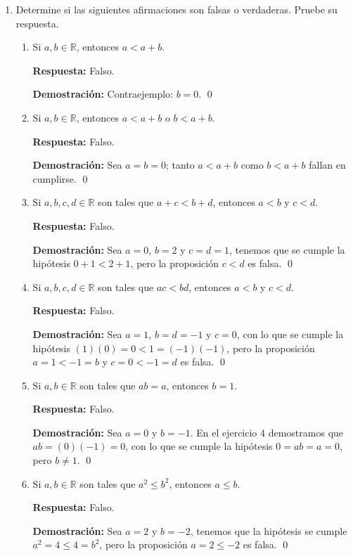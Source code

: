 \documentclass[11pt]{article}
\newcommand{\R}{\mathbb{R}}
\begin{document}
\begin{enumerate}
\item Determine si las siguientes afirmaciones son falsas o verdaderas. Pruebe su respuesta.
  \begin{enumerate}[label=(\alph*)]
    \item Si $a,b\in \R$, entonces $a<a+b$.

    \textbf{Respuesta:} Falso.

    \textbf{Demostración:} Contraejemplo: $b=0$. \qed

    \item Si $a,b\in \R$, entonces $a<a+b$ o $b<a+b$.

    \textbf{Respuesta:} Falso.

    \textbf{Demostración:}  Sea $a=b=0$; tanto $a<a+b$ como $b<a+b$ fallan en cumplirse. \qed

    \item Si $a,b,c,d\in \R$ son tales que $a+c<b+d$, entonces $a<b$ y $c<d$.

    \textbf{Respuesta:} Falso.

    \textbf{Demostración:} Sea $a=0$, $b=2$ y $c=d=1$, tenemos que se cumple la hipótesis $0+1<2+1$, pero la proposición $c<d$ es falsa. \qed

    \item Si $a,b,c,d \in \R$ son tales que $ac<bd$, entonces $a<b$ y $c<d$.

    \textbf{Respuesta:} Falso.

    \textbf{Demostración:} Sea $a=1$, $b=d=-1$ y $c=0$, con lo que se cumple la hipótesis $(1)(0)=0<1=(-1)(-1)$, pero la proposición $a=1<-1=b$ y $c=0<-1=d$ es falsa. \qed

    \item Si $a,b\in \R$ son tales que $ab=a$, entonces $b=1$.

    \textbf{Respuesta:} Falso.

    \textbf{Demostración:} Sea $a=0$ y $b=-1$. En el ejercicio 4 demostramos que $ab=(0)(-1)=0$, con lo que se cumple la hipótesis $0=ab=a=0$, pero $b\neq 1$. \qed

    \item Si $a,b\in \R$ son tales que $a^2\leq b^2$, entonces $a\leq b$.

    \textbf{Respuesta:} Falso.

    \textbf{Demostración:} Sea $a=2$ y $b=-2$, tenemos que la hipótesis se cumple $a^2=4\leq 4=b^2$, pero la proposición $a=2\leq -2$ es falsa. \qed

    \end{enumerate}
  \end{enumerate}
\end{document}
